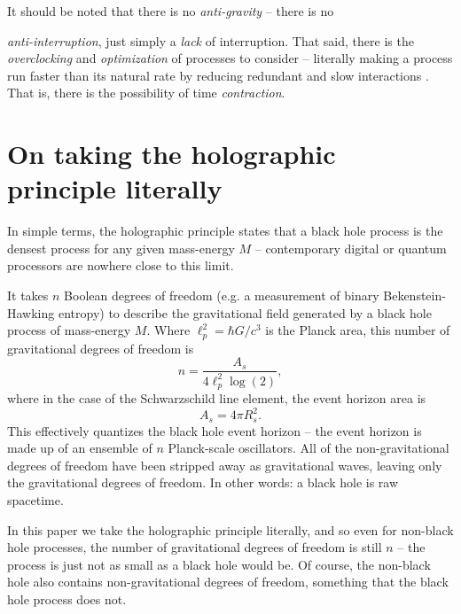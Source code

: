 \documentclass[12pt]{article}
\begin{document}
It should be noted that there is no {\textit{anti-gravity}} -- there is no {\textit{anti-interruption}, just simply a {\textit{lack}} of interruption.
That said, there is the {\textit{overclocking}} and {\textit{optimization}} of processes to consider -- literally making a process run faster than its natural rate by reducing redundant and slow interactions \cite{wainner, mcconnell, pikus}.
That is, there is the possibility of time {\textit{contraction}}.





\section{On taking the holographic principle literally}

In simple terms, the holographic principle states that a black hole process is the densest process for any given mass-energy $M$ -- contemporary digital or quantum processors are nowhere close to this limit.

It takes $n$ Boolean degrees of freedom (e.g. a measurement of binary Bekenstein-Hawking entropy) to describe the gravitational field \cite{hooft, susskind, bousso} generated by a black hole process of mass-energy $M$.
Where $\ell_p^2 = \hbar G / c^3$ is the Planck area, this number of gravitational degrees of freedom is
\begin{equation}
n = \frac{A_s}{4 \ell_p^2 \log(2)},
\end{equation}
where in the case of the Schwarzschild line element, the event horizon area is
\begin{equation}
A_s = 4 \pi R_s^2.
\end{equation}
This effectively quantizes the black hole event horizon -- the event horizon is made up of an ensemble of $n$ Planck-scale oscillators.
All of the non-gravitational degrees of freedom have been stripped away as gravitational waves, leaving only the gravitational degrees of freedom.
In other words: a black hole is raw spacetime.



In this paper we take the holographic principle literally, and so even for non-black hole processes, the number of gravitational degrees of freedom is still $n$ -- the process is just not as small as a black hole would be.
Of course, the non-black hole also contains non-gravitational degrees of freedom, something that the black hole process does not.


}
\end{document}
